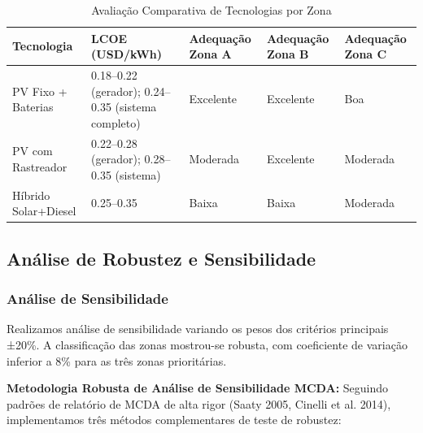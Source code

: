 \documentclass[12pt, a4paper]{article}
\begin{document}
\begin{table}[H]
\centering
\caption{Avaliação Comparativa de Tecnologias por Zona}
\label{Tab:8}

\small
\begin{tabular}{@{}l l l l l@{}}
\toprule
\rowcolor{LightBlue}\textbf{Tecnologia} & \textbf{LCOE (USD/kWh)} & \textbf{Adequação Zona A} & \textbf{Adequação Zona B} & \textbf{Adequação Zona C} \\
\midrule
PV Fixo + Baterias & 0.18--0.22 (gerador); 0.24--0.35 (sistema completo) & Excelente & Excelente & Boa \\
PV com Rastreador & 0.22--0.28 (gerador); 0.28--0.35 (sistema) & Moderada & Excelente & Moderada \\
Híbrido Solar+Diesel & 0.25--0.35 & Baixa & Baixa & Moderada \\
\bottomrule
\end{tabular}
\end{table}

\subsection{Análise de Robustez e Sensibilidade}

\subsubsection{Análise de Sensibilidade}

Realizamos análise de sensibilidade variando os pesos dos critérios principais ±20\%. A classificação das zonas mostrou-se robusta, com coeficiente de variação inferior a 8\% para as três zonas prioritárias.

\textbf{Metodologia Robusta de Análise de Sensibilidade MCDA:} Seguindo padrões de relatório de MCDA de alta rigor (Saaty 2005, Cinelli et al. 2014), implementamos três métodos complementares de teste de robustez:
\end{document}
